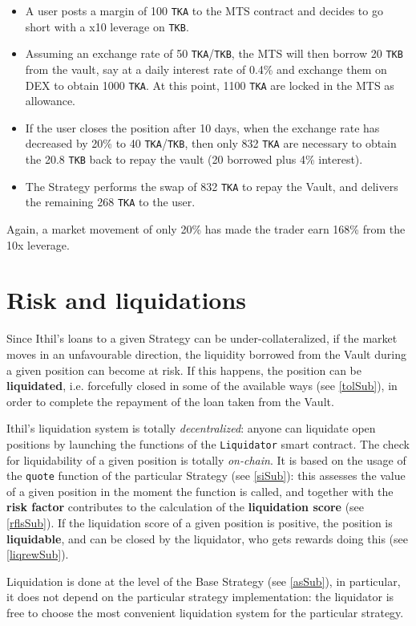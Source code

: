 \documentclass[a4paper,10 pt]{article}
\theoremstyle{definition}
\begin{document}
\begin{itemize}
\item A user posts a margin of 100 \verb|TKA| to the MTS contract and decides to go short with a x10 leverage on \verb|TKB|.
\item Assuming an exchange rate of 50 \verb|TKA|/\verb|TKB|, the MTS will then borrow 20 \verb|TKB| from the vault, say at a daily interest rate of 0.4\% and exchange them on DEX to obtain 1000 \verb|TKA|. At this point, 1100 \verb|TKA| are locked in the MTS as allowance.
\item If the user closes the position after 10 days, when the exchange rate has decreased by 20\% to 40 \verb|TKA|/\verb|TKB|, then only 832 \verb|TKA| are necessary to obtain the 20.8 \verb|TKB| back to repay the vault (20 borrowed plus 4\% interest).
\item The Strategy performs the swap of 832 \verb|TKA| to repay the Vault, and delivers the remaining 268 \verb|TKA| to the user. 
\end{itemize}
Again, a market movement of only 20\% has made the trader earn 168\% from the 10x leverage.

\section{Risk and liquidations}\label{liqSec}
Since Ithil's loans to a given Strategy can be under-collateralized, if the market moves in an unfavourable direction, the liquidity borrowed from the Vault during a given position can become at risk. If this happens, the position can be {\bf liquidated}, i.e. forcefully closed in some of the available ways (see \ref{tolSub}), in order to complete the repayment of the loan taken from the Vault.

Ithil's liquidation system is totally {\it decentralized}: anyone can liquidate open positions by launching the functions of the \verb|Liquidator| smart contract. The check for liquidability of a given position is totally {\it on-chain}. It is based on the usage of the \verb|quote| function of the particular Strategy (see \ref{siSub}): this assesses the value of a given position in the moment the function is called, and together with the {\bf risk factor} contributes to the calculation of the {\bf liquidation score} (see \ref{rflsSub}). If the liquidation score of a given position is positive, the position is {\bf liquidable}, and can be closed by the liquidator, who gets rewards doing this (see \ref{liqrewSub}).

Liquidation is done at the level of the Base Strategy (see \ref{asSub}), in particular, it does not depend on the particular strategy implementation: the liquidator is free to choose the most convenient liquidation system for the particular strategy.
\end{document}
